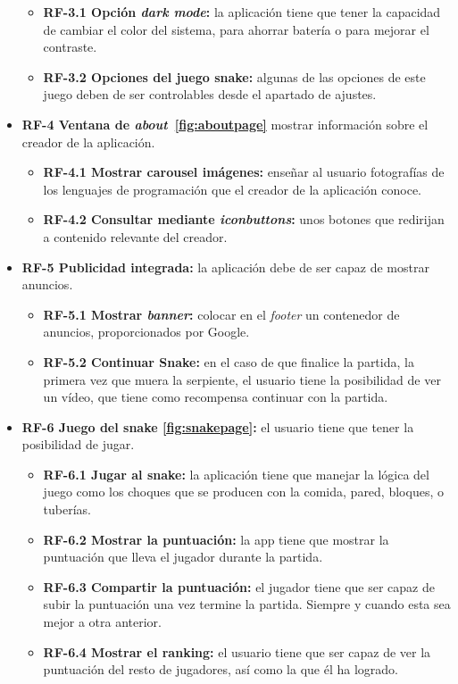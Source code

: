 \begin{itemize}
	\begin{itemize}
		\tightlist
		\item \textbf{RF-3.1 Opción \emph{dark mode}:} la aplicación tiene que tener la capacidad de cambiar el color del sistema, para ahorrar batería o para mejorar el contraste.
		\item \textbf{RF-3.2 Opciones del juego snake:} algunas de las opciones de este juego deben de ser controlables desde el apartado de ajustes.
	\end{itemize}
	
	\item \textbf{RF-4 Ventana de \emph{about}~\ref{fig:aboutpage}} mostrar información sobre el creador de la aplicación.
	
	\begin{itemize}
		\tightlist
		\item \textbf{RF-4.1 Mostrar carousel imágenes:} enseñar al usuario fotografías de los lenguajes de programación que el creador de la aplicación conoce.
		\item \textbf{RF-4.2 Consultar mediante \emph{iconbuttons}:} unos botones que redirijan a contenido relevante del creador.
	\end{itemize}
	
	\item \textbf{RF-5 Publicidad integrada:} la aplicación debe de ser capaz de mostrar anuncios.
	
	\begin{itemize}
		\tightlist
		\item \textbf{RF-5.1 Mostrar \emph{banner}:} colocar en el \emph{footer} un contenedor de anuncios, proporcionados por Google.
		\item \textbf{RF-5.2 Continuar Snake:} en el caso de que finalice la partida, la primera vez que muera la serpiente, el usuario tiene la posibilidad de ver un vídeo, que tiene como recompensa continuar con la partida. 
	\end{itemize}

	\item \textbf{RF-6 Juego del snake \ref{fig:snakepage}:} el usuario tiene que tener la posibilidad de jugar.
	
	\begin{itemize}
		\tightlist
		\item \textbf{RF-6.1 Jugar al snake:} la aplicación tiene que manejar la lógica del juego como los choques que se producen con la comida, pared, bloques, o tuberías.
		\item \textbf{RF-6.2 Mostrar la puntuación:} la app tiene que mostrar la puntuación que lleva el jugador durante la partida.
		\item \textbf{RF-6.3 Compartir la puntuación:} el jugador tiene que ser capaz de subir la puntuación una vez termine la partida. Siempre y cuando esta sea mejor a otra anterior.
		\item \textbf{RF-6.4 Mostrar el ranking:} el usuario tiene que ser capaz de ver la puntuación del resto de jugadores, así como la que él ha logrado.
	\end{itemize}


\end{itemize}

